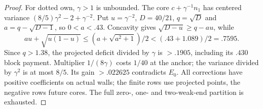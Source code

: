 \documentclass[11pt]{article}
\theoremstyle{definition}
\theoremstyle{remark}
\begin{document}
\begin{proof}
For dotted own, $\gamma>1$ is unbounded. The core
$c+\gamma^{-1}n_1$ has centered variance
$(8/5)\gamma^2-2+\gamma^{-2}$.
Put $u=\gamma^{-2}$, $D=40/21$, $q=\sqrt D$ and
$a=q-\sqrt{D-1}$, so $0<a<.43$.
Concavity gives $\sqrt{D-u}\ge q-au$, while
\[
 au+\sqrt{u(1-u)}\le(a+\sqrt{a^2+1})/2
                         <(.43+1.089)/2=.7595.
\]
Since $q>1.38$, the projected deficit divided by $\gamma$
is $>.1905$, including its $.430$ block payment.
Multiplier $1/(8\gamma)$ costs $1/40$ at the anchor;
the variance divided by $\gamma^2$ is at most $8/5$.
Its gain $>.022625$ contradicts $E_0$.
All corrections have positive coefficients on actual walls;
the finite rows use projected points, the negative rows future
cores. The full zero-, one- and two-weak-end partition is exhausted.
\end{proof}
\end{document}
